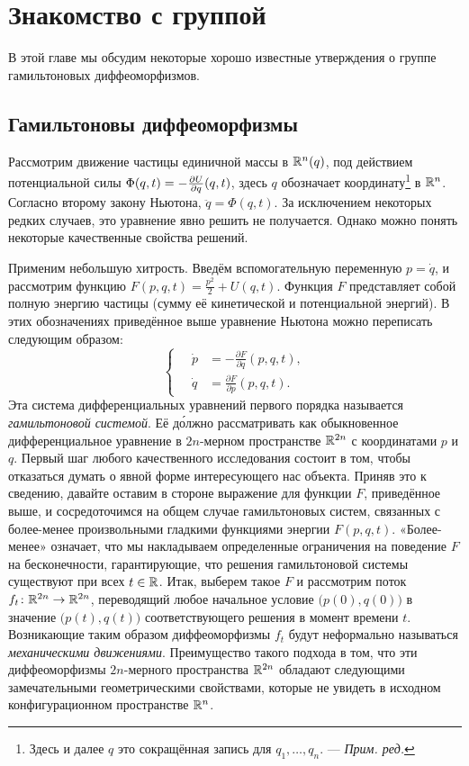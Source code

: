 \chapter{Знакомство с группой}\label{chap:1}

В этой главе мы обсудим некоторые хорошо известные утверждения о группе гамильтоновых диффеоморфизмов. 

\section[Гамильтоновы диффеоморфизмы]{Гамильтоновы диффеоморфизмы}

Рассмотрим движение частицы единичной массы в $\mathbb{R}^n(q)$, под
действием потенциальной силы $\Phi(q, t)  \z= - \tfrac{\partial
  U}{\partial q} (q, t)$, здесь $q$ обозначает
координату\footnote{Здесь и далее  $q$ это сокращённая запись для
  $q_1,\dots,q_n$. — \textit{Прим. ред.}} в $\mathbb{R}^n$. 
Согласно второму закону Ньютона, $\ddot q= \Phi (q, t)$.
За исключением некоторых редких случаев, это уравнение явно решить не получается.
Однако можно понять некоторые качественные свойства решений.

Применим небольшую хитрость.
Введём вспомогательную переменную $p = \dot q$, и рассмотрим функцию
$F(p,q,t)= \tfrac {p^2} 2 + U (q, t)$. 
Функция $F$ представляет собой полную энергию частицы (сумму её
кинетической и потенциальной энергий). 
В этих обозначениях приведённое выше уравнение Ньютона можно переписать следующим образом:
\[
\begin{cases}
\quad\dot p &= - \tfrac{\partial F}{\partial q} (p, q, t),\\
\quad\dot q &= \tfrac{\partial F}{\partial p} (p, q, t).
\end{cases}
\]
Эта система дифференциальных уравнений первого порядка называется
\emph{гамильтоновой системой}. 
Её д\'{о}лжно рассматривать как обыкновенное дифференциальное уравнение в
$2n$-мерном пространстве $\mathbb{R}^{2n}$ с координатами $p$ и $q$. 
Первый шаг любого качественного исследования состоит в том, чтобы
отказаться думать о явной форме интересующего нас объекта. 
Приняв это к сведению, давайте оставим в стороне выражение для функции $F$, приведённое выше, и сосредоточимся на общем случае гамильтоновых систем, связанных с
более-менее произвольными гладкими функциями энергии $F (p, q, t)$. 
«Более-менее» означает, что мы накладываем определенные ограничения на
поведение $F$ на бесконечности, гарантирующие, что решения
гамильтоновой системы существуют при всех $t\in \mathbb{R}$. 
Итак, выберем такое $F$ и рассмотрим поток $f_t\colon \mathbb{R}^{2n} \to
\mathbb{R}^{2n}$, переводящий любое начальное условие $\big(p(0),q(0)\big)$ в
значение $\big(p (t), q (t)\big)$ соответствующего решения в момент
времени $t$. 
Возникающие таким образом диффеоморфизмы $f_t$ будут неформально называться \emph{механическими движениями}.
Преимущество такого подхода в том, что эти диффеоморфизмы $2n$-мерного пространства $\mathbb{R}^{2n}$ обладают следующими замечательными геометрическими свойствами, которые не увидеть в исходном конфигурационном пространстве $\mathbb{R}^n$.

